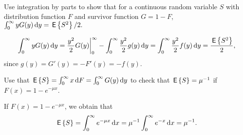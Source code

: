 \begin{exercise}
 Use integration by parts to show that for  a continuous random
    variable $S$ with distribution function $F$ and survivor function $G=1-F$, 
$\int_0^\infty y G(y) \,\text{d}y = \,\mathsf{E}\left\{S^2\right\}/2.$
\begin{solution}
  \begin{equation}
      \int_0^\infty y G(y) \,\text{d}y 
= \frac{y^2}2 G(y) \bigg|_0^\infty  - \int_0^\infty \frac{y^2}2 g(y)\,\text{d}y = \int_0^\infty \frac{y^2}2 f(y)\,\text{d}y = \frac{\,\mathsf{E}\left\{S^2\right\}}2,
  \end{equation}
  since $g(y) = G'(y) = - F'(y) = - f(y)$.
\end{solution}
\end{exercise}

\begin{exercise}
  Use that $\,\mathsf{E}\left\{S\right\} = \int_0^\infty x \,\text{d}F = \int_0^\infty G(y) \,\text{d}y$ to
  check that  $\,\mathsf{E}\left\{S\right\} = \mu^{-1}$ if $F(x) = 1 - e^{-\mu x}$.
\begin{solution}
If $F(x) = 1 - e^{-\mu x}$, we obtain that 
\begin{equation*}
  \,\mathsf{E}\left\{S\right\} = \int_0^\infty e^{-\mu x} \,\text{d}x =
  \mu^{-1}\int_0^\infty e^{-x} \,\text{d}x = \mu^{-1}.
\end{equation*}
\end{solution}
\end{exercise}


\begin{comment}
\begin{exercise}
  Assume that the time $X$ to fail of a machine is uniformly
  distributed on the interval $[0,10]$. If the machine fails at time
  $t$, the cost to repair it is $h(t)$. What is the expected repair
  cost? 
  \begin{solution}
    Write for $F(x) = \P{X\leq x}$ and $f(x) = \d F(x)/\d x$ for the
    density of $F$.
    \begin{equation*}
      \begin{split}
\E{h(X)}
&= \int_0^{10} \E{h(X) \given X = x} \P{X\in \d x} \\
&= \int_0^{10} \E{h(x) \given X = x} \d F(x) \\
&= \int_0^{10} \E{h(x) \given X = x} F(\d x) \\
&= \int_0^{10} \E{h(x) \given X = x} f(x) \d x \\
&= \int_0^{10} h(x)\frac{\d x}{10}.
      \end{split}
    \end{equation*}
    Here we introduce some notation that is commonly used in the
    probabity literature to indicate the same conceptual idea, i.e,
    $\P{X\in \d x} = \d F(x) = F(\d x) = f(x) \d x$, where the last
    equality follows from the fact that $F$ has a density $f$
    everywhere on $[0,10]$. 

    The concept of conditional expectation is of fundamental
    importance in probability theory. Any \emph{good} probability book
    defines this concept as a random variable measurable with respect
    to some $\sigma$-algebra. In this course we will not deal with
    this elegant idea, due to lack of time. 
  \end{solution}
\end{exercise}
\end{comment}


